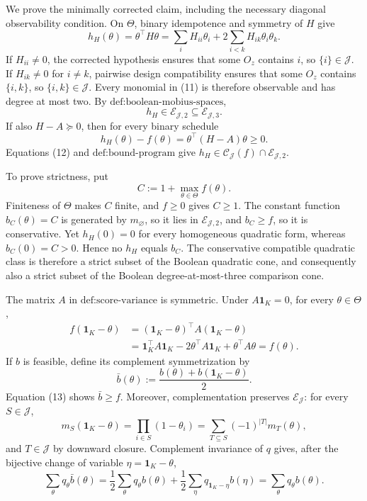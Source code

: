 We prove the minimally corrected claim, including the necessary diagonal observability condition.  On \(\Theta\), binary idempotence and symmetry of \(H\) give
\[
 h_H(\theta)=\theta^\top H\theta
 =\sum_iH_{ii}\theta_i+2\sum_{i<k}H_{ik}\theta_i\theta_k. \tag{11}
\]
If \(H_{ii}\ne0\), the corrected hypothesis ensures that some \(O_z\) contains \(i\), so \(\{i\}\in\mathcal J\).  If \(H_{ik}\ne0\) for \(i\ne k\), pairwise design compatibility ensures that some \(O_z\) contains \(\{i,k\}\), so \(\{i,k\}\in\mathcal J\).  Every monomial in (11) is therefore observable and has degree at most two.  By \(\text{def:boolean-mobius-spaces}\),
\[
 h_H\in\mathcal E_{\mathcal J,2}\subseteq\mathcal E_{\mathcal J,3}. \tag{12}
\]
If also \(H-A\succeq0\), then for every binary schedule
\[
 h_H(\theta)-f(\theta)=\theta^\top(H-A)\theta\ge0.
\]
Equations (12) and \(\text{def:bound-program}\) give
\(h_H\in\mathcal C_{\mathcal J}(f)\cap\mathcal E_{\mathcal J,2}\).

To prove strictness, put
\[
 C:=1+\max_{\theta\in\Theta}f(\theta).
\]
Finiteness of \(\Theta\) makes \(C\) finite, and \(f\ge0\) gives \(C\ge1\).  The constant function \(b_C(\theta)=C\) is generated by \(m_\varnothing\), so it lies in \(\mathcal E_{\mathcal J,2}\), and \(b_C\ge f\), so it is conservative.  Yet \(h_H(0)=0\) for every homogeneous quadratic form, whereas \(b_C(0)=C>0\).  Hence no \(h_H\) equals \(b_C\).  The conservative compatible quadratic class is therefore a strict subset of the Boolean quadratic cone, and consequently also a strict subset of the Boolean degree-at-most-three comparison cone.

The matrix \(A\) in \(\text{def:score-variance}\) is symmetric.  Under \(A\mathbf 1_K=0\), for every \(\theta\in\Theta\),
\[
 \begin{aligned}
 f(\mathbf 1_K-\theta)
 &=(\mathbf 1_K-\theta)^\top A(\mathbf 1_K-\theta)\\
 &=\mathbf 1_K^\top A\mathbf 1_K
   -2\theta^\top A\mathbf 1_K+\theta^\top A\theta
 =f(\theta).
 \end{aligned}\tag{13}
\]
If \(b\) is feasible, define its complement symmetrization by
\[
 \bar b(\theta):=\frac{b(\theta)+b(\mathbf 1_K-\theta)}2.
\]
Equation (13) shows \(\bar b\ge f\).  Moreover, complementation preserves \(\mathcal E_{\mathcal J}\): for every \(S\in\mathcal J\),
\[
 m_S(\mathbf 1_K-\theta)=\prod_{i\in S}(1-\theta_i)
 =\sum_{T\subseteq S}(-1)^{|T|}m_T(\theta),
\]
and \(T\in\mathcal J\) by downward closure.  Complement invariance of \(q\) gives, after the bijective change of variable \(\eta=\mathbf 1_K-\theta\),
\[
 \sum_\theta q_\theta\bar b(\theta)
 =\frac12\sum_\theta q_\theta b(\theta)
  +\frac12\sum_\eta q_{\mathbf 1_K-\eta}b(\eta)
 =\sum_\theta q_\theta b(\theta). \tag{14}
\]


